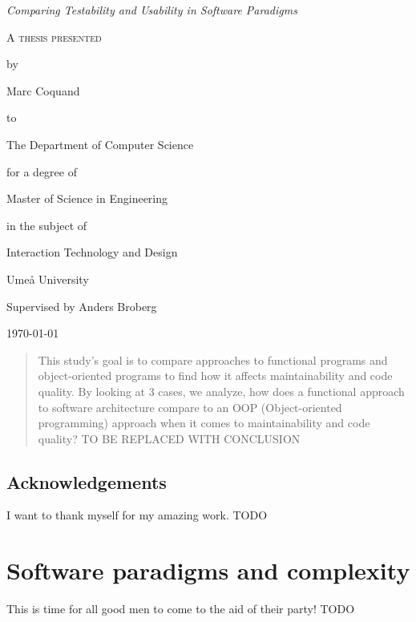 \documentclass[12pt]{report}
\theoremstyle{definition}
\theoremstyle{theorem}
\begin{document}
\begin{titlepage}
	\centering
    \null
    \vfill
    {\Large\itshape Comparing Testability and Usability in Software Paradigms
    \par}
    \vspace{3.0cm}
	{\scshape 
    A thesis presented \par 
    by\par
	Marc Coquand\par
	to\par
    The Department of Computer Science\par
    \vspace{0.8cm}
	for a degree of\par
    Master of Science in Engineering\par
    in the subject of\par
    Interaction Technology and Design\par}
    \vfill
    Umeå University\par
    Supervised by Anders Broberg\par
	\today\par
\end{titlepage}
\clearpage
\thispagestyle{empty}

\clearpage\newpage
\thispagestyle{empty}

\begin{abstract} 

    This study's goal is to compare approaches to functional programs and
    object-oriented programs to find how it affects maintainability and code
    quality. By looking at 3 cases, we analyze, how does a functional approach
    to software architecture compare to an OOP (Object-oriented programming)
    approach when it comes to maintainability and code quality? TO BE REPLACED
    WITH CONCLUSION

\end{abstract}

\clearpage\newpage
\thispagestyle{empty}

\section*{Acknowledgements}

I want to thank myself for my amazing work. TODO

\clearpage\newpage
\thispagestyle{empty}

\tableofcontents
\newpage

\chapter{Software paradigms and complexity}
This is time for all good men to come to the aid of their party! TODO
\end{document}
